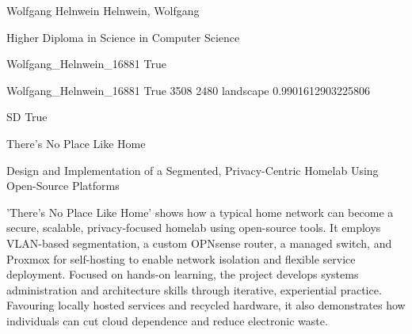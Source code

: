 
\begingroup{}\relax



\def\Key{Wolfgang_Helnwein_16881}

{Wolfgang Helnwein}
{Helnwein, Wolfgang}

{Higher Diploma in Science in Computer Science}

{Wolfgang_Helnwein_16881}
{True}

{Wolfgang_Helnwein_16881}
{True}
{3508}
{2480}
{landscape}
{0.9901612903225806}

{SD}
{True}

{There's No Place Like Home}

{Design and Implementation of a Segmented, Privacy-Centric Homelab Using Open-Source Platforms}

{'There's No Place Like Home' shows how a typical home network can become a secure, scalable, privacy-focused homelab using open-source tools. It employs VLAN-based segmentation, a custom OPNsense router, a managed switch, and Proxmox for self-hosting to enable network isolation and flexible service deployment. Focused on hands-on learning, the project develops systems administration and architecture skills through iterative, experiential practice. Favouring locally hosted services and recycled hardware, it also demonstrates how individuals can cut cloud dependence and reduce electronic waste.}


